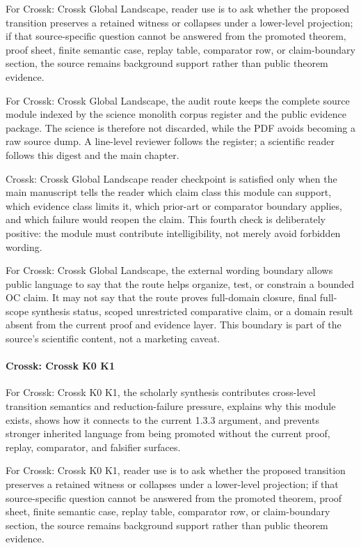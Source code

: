For Crossk: Crossk Global Landscape, reader use is to ask whether the proposed transition preserves a retained witness or collapses under a lower-level projection; if that source-specific question cannot be answered from the promoted theorem, proof sheet, finite semantic case, replay table, comparator row, or claim-boundary section, the source remains background support rather than public theorem evidence.


For Crossk: Crossk Global Landscape, the audit route keeps the complete source module indexed by the science monolith corpus register and the public evidence package. The science is therefore not discarded, while the PDF avoids becoming a raw source dump. A line-level reviewer follows the register; a scientific reader follows this digest and the main chapter.


Crossk: Crossk Global Landscape reader checkpoint is satisfied only when the main manuscript tells the reader which claim class this module can support, which evidence class limits it, which prior-art or comparator boundary applies, and which failure would reopen the claim. This fourth check is deliberately positive: the module must contribute intelligibility, not merely avoid forbidden wording.


For Crossk: Crossk Global Landscape, the external wording boundary allows public language to say that the route helps organize, test, or constrain a bounded OC claim. It may not say that the route proves full-domain closure, final full-scope synthesis status, scoped unrestricted comparative claim, or a domain result absent from the current proof and evidence layer. This boundary is part of the source's scientific content, not a marketing caveat.


\paragraph{Crossk: Crossk K0 K1}

For Crossk: Crossk K0 K1, the scholarly synthesis contributes cross-level transition semantics and reduction-failure pressure, explains why this module exists, shows how it connects to the current 1.3.3 argument, and prevents stronger inherited language from being promoted without the current proof, replay, comparator, and falsifier surfaces.


For Crossk: Crossk K0 K1, reader use is to ask whether the proposed transition preserves a retained witness or collapses under a lower-level projection; if that source-specific question cannot be answered from the promoted theorem, proof sheet, finite semantic case, replay table, comparator row, or claim-boundary section, the source remains background support rather than public theorem evidence.


